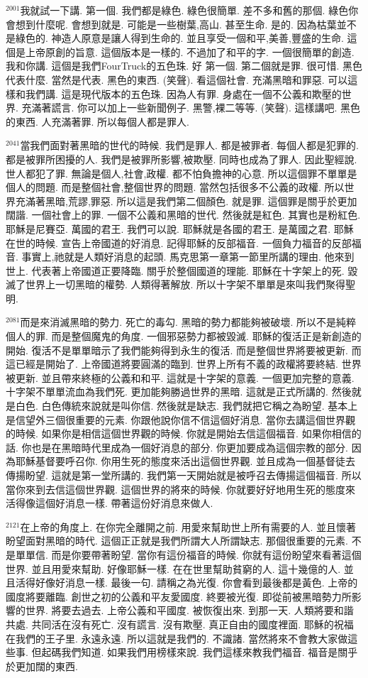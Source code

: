 \documentclass{book}
\begin{document}
$^{2001}$我就試一下講.
第一個.
我們都是綠色.
綠色很簡單.
差不多和舊的那個.
綠色你會想到什麼呢.
會想到就是.
可能是一些樹葉,高山.
甚至生命.
是的.
因為枯葉並不是綠色的.
神造人原意是讓人得到生命的.
並且享受一個和平,美善,豐盛的生命.
這個是上帝原創的旨意.
這個版本是一樣的.
不過加了和平的字.
一個很簡單的創造.
我和你講.
這個是我們FourTruck的五色珠.
好 第一個.
第二個就是罪.
很可惜.
黑色代表什麼.
當然是代表.
黑色的東西.
(笑聲).
看這個社會.
充滿黑暗和罪惡.
可以這樣和我們講.
這是現代版本的五色珠.
因為人有罪.
身處在一個不公義和欺壓的世界.
充滿著謊言.
你可以加上一些新聞例子.
黑警,裸二等等.
(笑聲).
這樣講吧.
黑色的東西.
人充滿著罪.
所以每個人都是罪人.

$^{2041}$當我們面對著黑暗的世代的時候.
我們是罪人.
都是被罪者.
每個人都是犯罪的.
都是被罪所困擾的人.
我們是被罪所影響,被欺壓.
同時也成為了罪人.
因此聖經說.
世人都犯了罪.
無論是個人,社會,政權.
都不怕負擔神的心意.
所以這個罪不單單是個人的問題.
而是整個社會,整個世界的問題.
當然包括很多不公義的政權.
所以世界充滿著黑暗,荒謬,罪惡.
所以這是我們第二個顏色.
就是罪.
這個罪是關乎於更加闊諧.
一個社會上的罪.
一個不公義和黑暗的世代.
然後就是紅色.
其實也是粉紅色.
耶穌是尼賽亞.
萬國的君王.
我們可以說.
耶穌就是各國的君王.
是萬國之君.
耶穌在世的時候.
宣告上帝國道的好消息.
記得耶穌的反部福音.
一個負力福音的反部福音.
事實上,祂就是人類好消息的起頭.
馬克思第一章第一節里所講的理由.
他來到世上.
代表著上帝國道正要降臨.
關乎於整個國道的理能.
耶穌在十字架上的死.
毀滅了世界上一切黑暗的權勢.
人類得著解放.
所以十字架不單單是來叫我們聚得聖明.

$^{2081}$而是來消滅黑暗的勢力.
死亡的毒勾.
黑暗的勢力都能夠被破壞.
所以不是純粹個人的罪.
而是整個魔鬼的角度.
一個邪惡勢力都被毀滅.
耶穌的復活正是新創造的開始.
復活不是單單暗示了我們能夠得到永生的復活.
而是整個世界將要被更新.
而這已經是開始了.
上帝國道將要圓滿的臨到.
世界上所有不義的政權將要終結.
世界被更新.
並且帶來終極的公義和和平.
這就是十字架的意義.
一個更加完整的意義.
十字架不單單流血為我們死.
更加能夠勝過世界的黑暗.
這就是正式所講的.
然後就是白色.
白色傳統來說就是叫你信.
然後就是缺志.
我們就把它稱之為盼望.
基本上是信望外三個很重要的元素.
你跟他說你信不信這個好消息.
當你去講這個世界觀的時候.
如果你是相信這個世界觀的時候.
你就是開始去信這個福音.
如果你相信的話.
你也是在黑暗時代里成為一個好消息的部分.
你更加要成為這個宗教的部分.
因為耶穌基督要呼召你.
你用生死的態度來活出這個世界觀.
並且成為一個基督徒去傳揚盼望.
這就是第一堂所講的.
我們第一天開始就是被呼召去傳揚這個福音.
所以當你來到去信這個世界觀.
這個世界的將來的時候.
你就要好好地用生死的態度來活得像這個好消息一樣.
帶著這份好消息來做人.

$^{2121}$在上帝的角度上.
在你完全離開之前.
用愛來幫助世上所有需要的人.
並且懷著盼望面對黑暗的時代.
這個正正就是我們所謂大人所謂缺志.
那個很重要的元素.
不是單單信.
而是你要帶著盼望.
當你有這份福音的時候.
你就有這份盼望來看著這個世界.
並且用愛來幫助.
好像耶穌一樣.
在在世里幫助貧窮的人.
這十幾億的人.
並且活得好像好消息一樣.
最後一句.
請稱之為光復.
你會看到最後都是黃色.
上帝的國度將要離臨.
創世之初的公義和平友愛國度.
終要被光復.
即從前被黑暗勢力所影響的世界.
將要去過去.
上帝公義和平國度.
被恢復出來.
到那一天.
人類將要和諧共處.
共同活在沒有死亡.
沒有謊言.
沒有欺壓.
真正自由的國度裡面.
耶穌的祝福在我們的王子里.
永遠永遠.
所以這就是我們的.
不識諸.
當然將來不會教大家做這些事.
但起碼我們知道.
如果我們用榜樣來說.
我們這樣來教我們福音.
福音是關乎於更加闊的東西.
\end{document}
